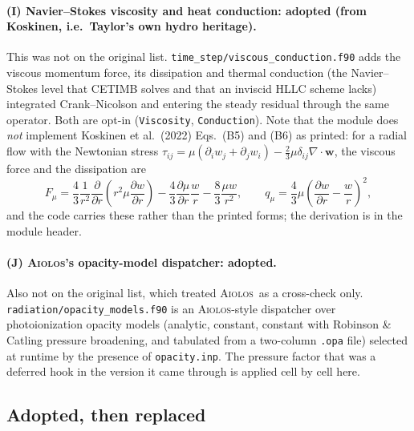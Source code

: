 \documentclass[english,a4paper]{my_memo}
\newcommand{\AIOLOS}{\textsc{Aiolos}}
\begin{document}
\paragraph{(I) Navier--Stokes viscosity and heat conduction: adopted (from
Koskinen, i.e.\ Taylor's own hydro heritage).} This was not on the original
list. \texttt{time\_step/viscous\_conduction.f90} adds the viscous momentum
force, its dissipation and thermal conduction (the Navier--Stokes level that
CETIMB solves and that an inviscid HLLC scheme lacks) integrated
Crank--Nicolson and entering the steady residual through the same operator.
Both are opt-in (\texttt{Viscosity}, \texttt{Conduction}). Note that the module
does \emph{not} implement Koskinen et al.\ (2022) Eqs.~(B5) and (B6) as
printed: for a radial flow with the Newtonian stress
$\tau_{ij} = \mu(\partial_i w_j + \partial_j w_i) - \frac{2}{3}\mu
\delta_{ij}\nabla\!\cdot\!\mathbf{w}$, the viscous force and the dissipation
are
\[
  F_\mu = \frac{4}{3}\frac{1}{r^2}\frac{\partial}{\partial r}
          \!\left(r^2 \mu \frac{\partial w}{\partial r}\right)
        - \frac{4}{3}\frac{\partial \mu}{\partial r}\frac{w}{r}
        - \frac{8}{3}\frac{\mu w}{r^2},
  \qquad
  q_\mu = \frac{4}{3}\mu\!\left(\frac{\partial w}{\partial r}
          - \frac{w}{r}\right)^{\!2},
\]
and the code carries these rather than the printed forms; the derivation is in
the module header.

\paragraph{(J) \AIOLOS's opacity-model dispatcher: adopted.} Also not on the
original list, which treated \AIOLOS\ as a cross-check only.
\texttt{radiation/opacity\_models.f90} is an \AIOLOS-style dispatcher over
photoionization opacity models (analytic, constant, constant with
Robinson \& Catling pressure broadening, and tabulated from a two-column
\texttt{.opa} file) selected at runtime by the presence of
\texttt{opacity.inp}. The pressure factor that was a deferred hook in the
version it came through is applied cell by cell here.

\subsection{Adopted, then replaced}
\end{document}
